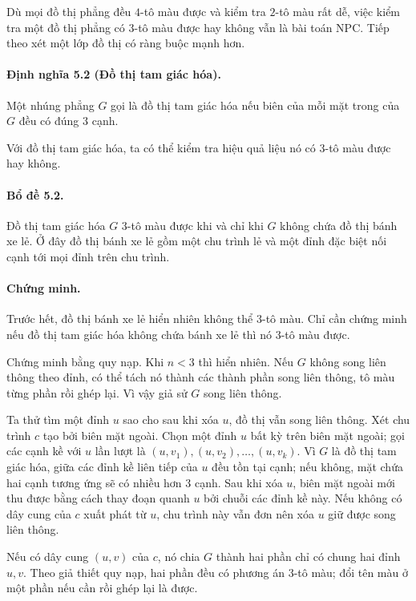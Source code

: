 \documentclass[11pt]{article}
\begin{document}
Dù mọi đồ thị phẳng đều $4$-tô màu được và kiểm tra $2$-tô màu rất dễ, việc
kiểm tra một đồ thị phẳng có $3$-tô màu được hay không vẫn là bài toán
NPC. Tiếp theo xét một lớp đồ thị có ràng buộc mạnh hơn.

\paragraph{Định nghĩa 5.2 (Đồ thị tam giác hóa).}
Một nhúng phẳng $G$ gọi là đồ thị tam giác hóa nếu biên của mỗi mặt trong của
$G$ đều có đúng $3$ cạnh.

Với đồ thị tam giác hóa, ta có thể kiểm tra hiệu quả liệu nó có $3$-tô màu được
hay không.

\paragraph{Bổ đề 5.2.}
Đồ thị tam giác hóa $G$ $3$-tô màu được khi và chỉ khi $G$ không chứa đồ thị
bánh xe lẻ. Ở đây đồ thị bánh xe lẻ gồm một chu trình lẻ và một đỉnh đặc biệt
nối cạnh tới mọi đỉnh trên chu trình.

\paragraph{Chứng minh.}
Trước hết, đồ thị bánh xe lẻ hiển nhiên không thể $3$-tô màu. Chỉ cần chứng
minh nếu đồ thị tam giác hóa không chứa bánh xe lẻ thì nó $3$-tô màu được.

Chứng minh bằng quy nạp. Khi $n<3$ thì hiển nhiên. Nếu $G$ không song liên
thông theo đỉnh, có thể tách nó thành các thành phần song liên thông, tô màu
từng phần rồi ghép lại. Vì vậy giả sử $G$ song liên thông.

Ta thử tìm một đỉnh $u$ sao cho sau khi xóa $u$, đồ thị vẫn song liên thông.
Xét chu trình $c$ tạo bởi biên mặt ngoài. Chọn một đỉnh $u$ bất kỳ trên biên
mặt ngoài; gọi các cạnh kề với $u$ lần lượt là
$(u,v_1),(u,v_2),\ldots,(u,v_k)$. Vì $G$ là đồ thị tam giác hóa, giữa các đỉnh
kề liên tiếp của $u$ đều tồn tại cạnh; nếu không, mặt chứa hai cạnh tương ứng
sẽ có nhiều hơn $3$ cạnh. Sau khi xóa $u$, biên mặt ngoài mới thu được bằng
cách thay đoạn quanh $u$ bởi chuỗi các đỉnh kề này. Nếu không có dây cung của
$c$ xuất phát từ $u$, chu trình này vẫn đơn nên xóa $u$ giữ được song liên
thông.

Nếu có dây cung $(u,v)$ của $c$, nó chia $G$ thành hai phần chỉ có chung hai
đỉnh $u,v$. Theo giả thiết quy nạp, hai phần đều có phương án $3$-tô màu; đổi
tên màu ở một phần nếu cần rồi ghép lại là được.
\end{document}
